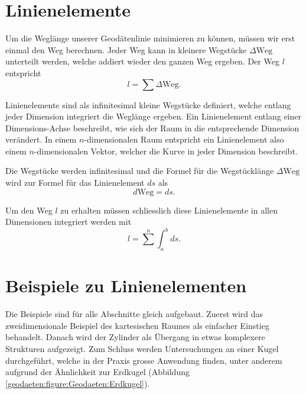 %
%
%
%
\section{Linienelemente\label{geodaeten:section:Linienelemente}}

Um die Weglänge unserer Geodätenlinie minimieren zu können, müssen wir erst einmal den Weg berechnen.
Jeder Weg kann in kleinere Wegstücke $\Delta \text{Weg}$ unterteilt werden, welche addiert wieder den ganzen Weg ergeben.
Der Weg $l$ entspricht 
\begin{equation}
	l = \sum \Delta \text{Weg} .
\end{equation}

Linienelemente sind als infinitesimal kleine Wegstücke definiert, welche entlang jeder Dimension integriert die Weglänge ergeben.
Ein Linienelement entlang einer Dimensions-Achse beschreibt, wie sich der Raum in die entsprechende Dimension verändert.
In einem $n$-dimensionalen Raum entspricht ein Linienelement also einem $n$-dimensionalen Vektor, welcher die Kurve in jeder Dimension beschreibt.

Die Wegstücke werden infinitesimal und die Formel für die Wegstücklänge $\Delta \text{Weg}$ wird zur Formel für das Linienelement $ds$  als
\begin{equation}	
	d\text{Weg} = ds .
	\label{geodaeten:equation:Linienelemente:equation1}
\end{equation}

Um den Weg $l$ zu erhalten müssen schliesslich diese Linienelemente in allen Dimensionen integriert werden mit
\begin{equation}
	l = 
	\sum^{n} \int_a^b ds .
	\label{geodaeten:equation:Linienelemente:equation2}
\end{equation}

\section{Beispiele zu Linienelementen\label{geodaeten:section:Linienelemente:Beispiele}}
Die Beispiele sind für alle Abschnitte gleich aufgebaut.
Zuerst wird das zweidimensionale Beispiel des kartesischen Raumes als einfacher Einstieg behandelt.
Danach wird der Zylinder als Übergang in etwas komplexere Strukturen aufgezeigt.
Zum Schluss werden Untersuchungen an einer Kugel durchgeführt, welche in der Praxis grosse Anwendung finden, unter anderem aufgrund der Ähnlichkeit zur Erdkugel (Abbildung \ref{geodaeten:figure:Geodaeten:Erdkugel}).

	
	
	

